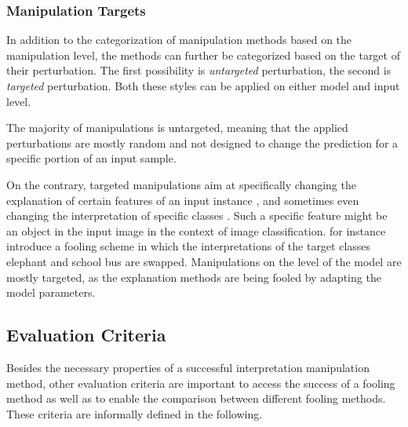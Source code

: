 \subsubsection{Manipulation Targets}
\label{subsubsec:manipulation_targets}

\par\smallskip
\noindent
In addition to the categorization of manipulation methods based on the manipulation level, the methods can further be categorized based on the target of their perturbation. The first possibility is \textit{untargeted} perturbation, the second is \textit{targeted} perturbation. Both these styles can be applied on either model and input level. 

The majority of manipulations is untargeted, meaning that the applied perturbations are mostly random and not designed to change the prediction for a specific portion of an input sample. 

On the contrary, targeted manipulations aim at specifically changing the explanation of certain features of an input instance \cite{fooling_nn_interpreters}, and sometimes even changing the interpretation of specific classes \cite{simonyan2013deep}. Such a specific feature might be an object in the input image in the context of image classification. \cite{fooling_nn_interpreters} for instance introduce a fooling scheme in which the interpretations of the target classes elephant and school bus are swapped. 
Manipulations on the level of the model are mostly targeted, as the explanation methods are being fooled by adapting the model parameters. 


\subsection{Evaluation Criteria}
\label{subsec:eval_criteria_manipulations}
Besides the necessary properties of a successful interpretation manipulation method, other evaluation criteria are important to access the success of a fooling method as well as to enable the comparison between different fooling methods. These criteria are informally defined in the following.

